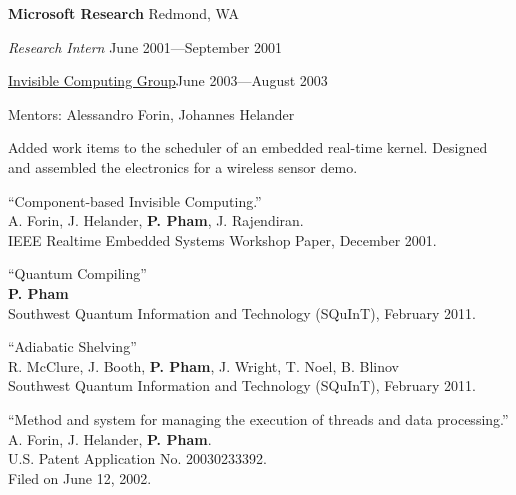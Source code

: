 \documentclass[letter]{article}
\begin{document}
\vspace{\baselineskip}
\par
{\bf Microsoft Research} \hfill Redmond, WA
\par
{\em Research Intern} \hfill June 2001---September 2001
\par
\href{http://research.microsoft.com/en-us/projects/mic/default.aspx}{Invisible Computing Group}\hfill June 2003---August 2003
\par
Mentors: Alessandro Forin, Johannes Helander
\par
Added work items to the scheduler of an embedded real-time kernel.
Designed and assembled the electronics for a wireless sensor demo.

\par


\vspace{\baselineskip}
\par
``Component-based Invisible Computing.''
\\
A. Forin, J. Helander, \textbf{P. Pham}, J. Rajendiran.\\
IEEE Realtime Embedded Systems Workshop Paper, December 2001.

\vspace{\baselineskip}
\par
``Quantum Compiling''
\\
\textbf{P. Pham}\\
Southwest Quantum Information and Technology (SQuInT), February 2011.

\vspace{\baselineskip}
\par
``Adiabatic Shelving''\\
R. McClure, J. Booth, \textbf{P. Pham}, J. Wright, T. Noel, B. Blinov\\
Southwest Quantum Information and Technology (SQuInT), February 2011.

\vspace{\baselineskip}

``Method and system for managing the execution of threads and data processing.''
\\
A. Forin, J. Helander, \textbf{P. Pham}.\\
U.S. Patent Application No. 20030233392.\\
Filed on June 12, 2002.


\vspace{\baselineskip}
\end{document}

